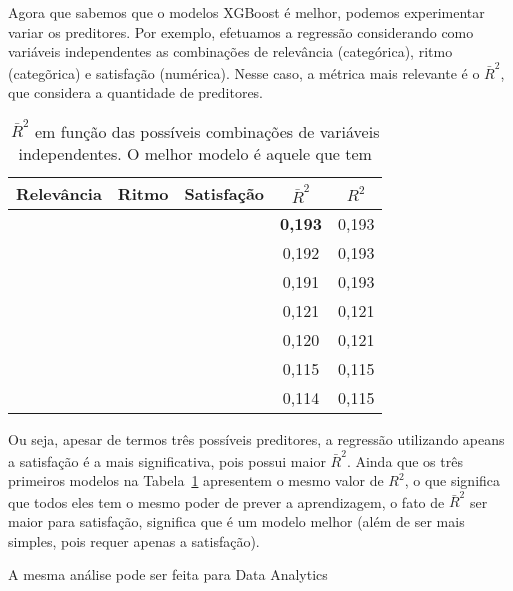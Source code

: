 Agora que sabemos que o modelos XGBoost é melhor, podemos experimentar variar os preditores.
Por exemplo, efetuamos a regressão considerando como variáveis independentes as combinações de relevância (categórica), ritmo (categõrica) e satisfação (numérica). Nesse caso, a métrica mais relevante é o $\bar R^2$, que considera a quantidade de preditores.

\begin{table}
	\centering
	\caption{$\bar R^2$ em função das possíveis combinações de variáveis independentes. O melhor modelo é aquele que tem }
	\label{tab:reg-ds-2}
	\begin{tabular}{ccccc}
		\toprule
		Relevância & Ritmo      & Satisfação & $\bar R^2$ & $R^2$\\
		\midrule
		           &            & \checkmark & \textbf{0,193} & 0,193\\
		\checkmark & \checkmark &            & 0,192          & 0,193\\
		\checkmark & \checkmark & \checkmark & 0,191          & 0,193\\
		           & \checkmark &            & 0,121          & 0,121\\
		           & \checkmark & \checkmark & 0,120          & 0,121\\
		\checkmark &            &            & 0,115          & 0,115\\
		\checkmark &            & \checkmark & 0,114          & 0,115\\
		\bottomrule
	\end{tabular}
\end{table}

Ou seja, apesar de termos três possíveis preditores, a regressão utilizando apeans a satisfação é a mais significativa, pois possui maior $\bar R^2$.
Ainda que os três primeiros modelos na Tabela~\ref{tab:reg-ds-2} apresentem o mesmo valor de $R^2$, o que significa que todos eles tem o mesmo poder de prever a aprendizagem, o fato de $\bar R^2$ ser maior para satisfação, significa que é um modelo melhor (além de ser mais simples, pois requer apenas a satisfação).



A mesma análise pode ser feita para Data Analytics

